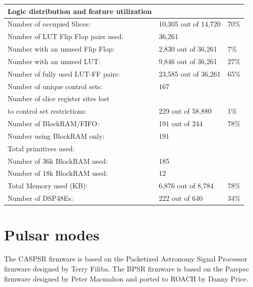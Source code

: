 \documentclass[letterpaper,10pt,english]{sphinxmanual}
\begin{document}
\begin{tabulary}{\linewidth}{|L|L|L|}
\hline
\textbf{
Logic distribution and feature utilization
} & \textbf{} & \textbf{}\\\hline

Number of occupied Slices:
 & 
10,305 out of  14,720
 & 
70\%
\\\hline

Number of LUT Flip Flop pairs used:
 & 
36,261
 & \\\hline

Number with an unused Flip Flop:
 & 
2,830 out of  36,261
 & 
7\%
\\\hline

Number with an unused LUT:
 & 
9,846 out of  36,261
 & 
27\%
\\\hline

Number of fully used LUT-FF pairs:
 & 
23,585 out of  36,261
 & 
65\%
\\\hline

Number of unique control sets:
 & 
167
 & \\\hline

Number of slice register sites lost
 &  & \\\hline

to control set restrictions:
 & 
229 out of  58,880
 & 
1\%
\\\hline

Number of BlockRAM/FIFO:
 & 
191 out of     244
 & 
78\%
\\\hline

Number using BlockRAM only:
 & 
191
 & \\\hline

Total primitives used:
 &  & \\\hline

Number of 36k BlockRAM used:
 & 
185
 & \\\hline

Number of 18k BlockRAM used:
 & 
12
 & \\\hline

Total Memory used (KB):
 & 
6,876 out of   8,784
 & 
78\%
\\\hline

Number of DSP48Es:
 & 
222 out of     640
 & 
34\%
\\\hline
\end{tabulary}



\section{Pulsar modes}
\label{gateware:pulsar-modes}
The CASPSR firmware is based on the Packetized Astronomy Signal Processor
firmware designed by Terry Filiba. The BPSR firmware is based on the Parspec
firmware designed by Peter Macmahon and ported to ROACH by Danny Price.
\end{document}
